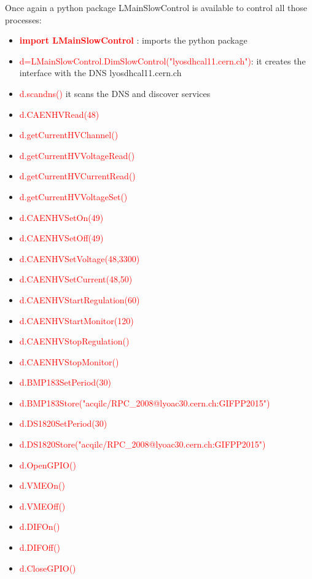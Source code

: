 \documentclass[english]{article}
\begin{document}
Once again a python package LMainSlowControl is available to control all those processes:
\begin{itemize}
\item \textcolor{red}{ \bf  import LMainSlowControl} :  imports the python package
\item \textcolor{red}{d=LMainSlowControl.DimSlowControl("lyosdhcal11.cern.ch")}: it creates the interface with the DNS lyosdhcal11.cern.ch
\item \textcolor{red}{d.scandns() } it scans the DNS and discover services 
\item \textcolor{red}{d.CAENHVRead(48)}
\item \textcolor{red}{d.getCurrentHVChannel()}
\item \textcolor{red}{d.getCurrentHVVoltageRead()}
\item \textcolor{red}{d.getCurrentHVCurrentRead()}
\item \textcolor{red}{d.getCurrentHVVoltageSet()}
\item \textcolor{red}{d.CAENHVSetOn(49)}
\item \textcolor{red}{d.CAENHVSetOff(49)}
\item \textcolor{red}{d.CAENHVSetVoltage(48,3300)}
\item \textcolor{red}{d.CAENHVSetCurrent(48,50)}
\item \textcolor{red}{d.CAENHVStartRegulation(60)}
\item \textcolor{red}{d.CAENHVStartMonitor(120)}
\item \textcolor{red}{d.CAENHVStopRegulation()}
\item \textcolor{red}{d.CAENHVStopMonitor()}
\item \textcolor{red}{d.BMP183SetPeriod(30)}
\item \textcolor{red}{d.BMP183Store("acqilc/RPC\_2008@lyoac30.cern.ch:GIFPP2015")}
\item \textcolor{red}{d.DS1820SetPeriod(30)}
\item \textcolor{red}{d.DS1820Store("acqilc/RPC\_2008@lyoac30.cern.ch:GIFPP2015")}
\item \textcolor{red}{d.OpenGPIO()}
\item \textcolor{red}{d.VMEOn()}
\item \textcolor{red}{d.VMEOff()}
\item \textcolor{red}{d.DIFOn()}
\item \textcolor{red}{d.DIFOff()}
\item \textcolor{red}{d.CloseGPIO()}

\end{itemize}
\end{document}
